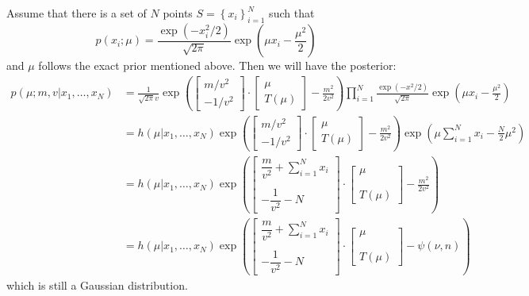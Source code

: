 \documentclass[12pt]{article}
\begin{document}
Assume that there is a set of $N$ points $S=\left\{x_i \right\}_{i=1}^N$ such that $$p(x_i;\mu)=\frac{\exp(-x_i^2/2)}{\sqrt{2\pi}}\exp\left( \mu x_i-\frac{\mu^2}{2} \right)$$ and $\mu$ follows the exact prior mentioned above. Then we will have the posterior:
\begin{align*}
    p(\mu;m,v|x_1,\ldots,x_N)&=\frac{1}{\sqrt{2\pi}v}\exp\left( \begin{bmatrix}
        m/v^2\\-1/v^2
    \end{bmatrix}\cdot\begin{bmatrix}
        \mu\\T(\mu)
    \end{bmatrix}-\frac{m^2}{2v^2} \right)\prod_{i=1}^N\frac{\exp(-x^2/2)}{\sqrt{2\pi}}\exp\left( \mu x_i-\frac{\mu^2}{2} \right)\\
    &=h(\mu|x_1,\ldots,x_N)\exp\left( \begin{bmatrix}
        m/v^2\\-1/v^2
    \end{bmatrix}\cdot\begin{bmatrix}
        \mu\\T(\mu)
    \end{bmatrix}-\frac{m^2}{2v^2} \right)\exp\left( \mu\sum_{i=1}^Nx_i-\frac{N}{2}\mu^2 \right)\\
    &=h(\mu|x_1,\ldots,x_N)\exp\left( \begin{bmatrix}
        \dfrac{m}{v^2}+\sum_{i=1}^Nx_i\\~\\-\dfrac{1}{v^2}-N
    \end{bmatrix}\cdot\begin{bmatrix}
        \mu\\~\\~\\T(\mu)
    \end{bmatrix}-\frac{m^2}{2v^2} \right)\\&=h(\mu|x_1,\ldots,x_N)\exp\left( \begin{bmatrix}
        \dfrac{m}{v^2}+\sum_{i=1}^Nx_i\\~\\-\dfrac{1}{v^2}-N
    \end{bmatrix}\cdot\begin{bmatrix}
        \mu\\~\\~\\T(\mu)
    \end{bmatrix}-\psi(\nu,n) \right)
\end{align*}
which is still a Gaussian distribution.
\end{document}
